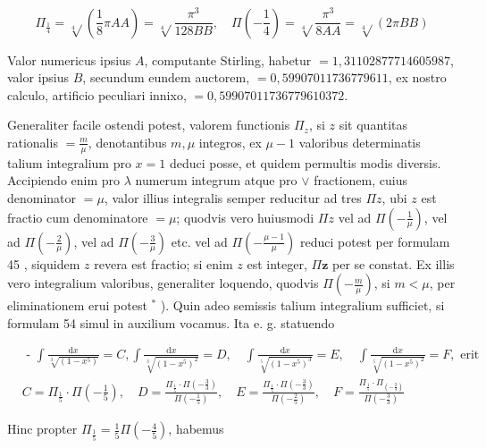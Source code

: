 \documentclass[10pt]{article}
\begin{document}
\[
\Pi_{\frac{1}{4}}=\sqrt[4]{ }\left(\frac{1}{8} \pi A A\right)=\sqrt[4]{ } \frac{\pi^{3}}{128 B B}, \quad \Pi\left(-\frac{1}{4}\right)=\sqrt[4]{ } \frac{\pi^{3}}{8 A A}=\sqrt[4]{ }(2 \pi B B)
\]

Valor numericus ipsius \(A\), computante Stirling, habetur \(=1,31102877714605987\), valor ipsius \(B\), secundum eundem auctorem, \(=0,59907011736779611\), ex nostro calculo, artificio peculiari innixo, \(=0,59907011736779610372\).

Generaliter facile ostendi potest, valorem functionis \(\Pi_{z}\), si \(z\) sit quantitas rationalis \(=\frac{m}{\mu}\), denotantibus \(m, \mu\) integros, ex \(\mu-1\) valoribus determinatis talium integralium pro \(x=1\) deduci posse, et quidem permultis modis diversis. Accipiendo enim pro \(\lambda\) numerum integrum atque pro \(\vee\) fractionem, cuius denominator \(=\mu\), valor illius integralis semper reducitur ad tres \(\Pi z\), ubi \(z\) est fractio cum denominatore \(=\mu\); quodvis vero huiusmodi \(\Pi z\) vel ad \(\Pi\left(-\frac{1}{\mu}\right)\), vel ad \(\Pi\left(-\frac{2}{\mu}\right)\), vel ad \(\Pi\left(-\frac{3}{\mu}\right)\) etc. vel ad \(\Pi\left(-\frac{\mu-1}{\mu}\right)\) reduci potest per formulam 45 , siquidem \(z\) revera est fractio; si enim \(z\) est integer, \(\Pi \boldsymbol{z}\) per se constat. Ex illis vero integralium valoribus, generaliter loquendo, quodvis \(\Pi\left(-\frac{m}{\mu}\right)\),
si \(m<\mu\), per eliminationem erui potest \({ }^{*}\) ). Quin adeo semissis talium integralium sufficiet, si formulam 54 simul in auxilium vocamus. Ita e. g. statuendo

\[
\begin{aligned}
& \text { - } \int \frac{\mathrm{d} x}{\sqrt[3]{\left(1-x^{5}\right)}}=C, \int \frac{\mathrm{d} x}{\sqrt[3]{\left(1-x^{5}\right)^{2}}}=D, \quad \int \frac{\mathrm{d} x}{\sqrt[5]{\left(1-x^{5}\right)^{3}}}=E, \quad \int \frac{\mathrm{d} x}{\sqrt[5]{\left(1-x^{5}\right)^{2}}}=F, \text { erit } \\
& C=\Pi_{\frac{1}{5}} \cdot \Pi\left(-\frac{1}{5}\right), \quad D=\frac{\Pi_{\frac{1}{5}} \cdot \Pi\left(-\frac{3}{3}\right)}{\Pi\left(-\frac{1}{5}\right)}, \quad E=\frac{\Pi_{\frac{1}{5}} \cdot \Pi\left(-\frac{3}{3}\right)}{\Pi\left(-\frac{2}{5}\right)}, \quad F=\frac{\Pi_{\frac{1}{5}} \cdot \Pi_{\left(-\frac{2}{3}\right)}}{\Pi\left(-\frac{3}{3}\right)}
\end{aligned}
\]

Hinc propter \(\Pi_{\frac{1}{5}}=\frac{1}{5} \Pi\left(-\frac{4}{5}\right)\), habemus
\end{document}
